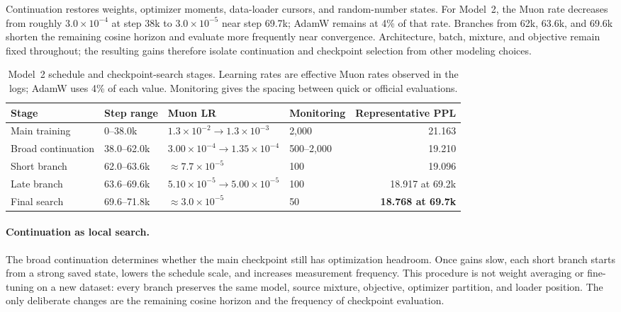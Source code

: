 \documentclass{article}
\begin{document}
Continuation restores weights, optimizer moments, data-loader cursors, and
random-number states. For Model~2, the Muon rate decreases from roughly
$3.0{\times}10^{-4}$ at step 38k to $3.0{\times}10^{-5}$ near step 69.7k;
AdamW remains at 4\% of that rate. Branches from 62k, 63.6k, and 69.6k shorten
the remaining cosine horizon and evaluate more frequently near convergence.
Architecture, batch, mixture, and objective remain fixed throughout; the
resulting gains therefore isolate continuation and checkpoint selection from
other modeling choices.

\begin{table}[H]
  \caption{Model~2 schedule and checkpoint-search stages. Learning rates are
  effective Muon rates observed in the logs; AdamW uses 4\% of each value.
  Monitoring gives the spacing between quick or official evaluations.}
  \label{tab:continuation-stages}
  \centering
  \small
  \setlength{\tabcolsep}{4.5pt}
  \begin{tabular}{@{}llllr@{}}
    \toprule
    Stage & Step range & Muon LR & Monitoring & Representative PPL \\
    \midrule
    Main training & 0--38.0k & $1.3{\times}10^{-2}\!\rightarrow1.3{\times}10^{-3}$ &
      2,000 & 21.163 \\
    Broad continuation & 38.0--62.0k &
      $3.00{\times}10^{-4}\!\rightarrow1.35{\times}10^{-4}$ &
      500--2,000 & 19.210 \\
    Short branch & 62.0--63.6k & $\approx7.7{\times}10^{-5}$ &
      100 & 19.096 \\
    Late branch & 63.6--69.6k &
      $5.10{\times}10^{-5}\!\rightarrow5.00{\times}10^{-5}$ &
      100 & 18.917 at 69.2k \\
    Final search & 69.6--71.8k & $\approx3.0{\times}10^{-5}$ &
      50 & \textbf{18.768 at 69.7k} \\
    \bottomrule
  \end{tabular}
\end{table}

\paragraph{Continuation as local search.}
The broad continuation determines whether the main checkpoint still has
optimization headroom. Once gains slow, each short branch starts from a
strong saved state, lowers the schedule scale, and increases measurement
frequency. This procedure is not weight averaging or fine-tuning on a new
dataset: every branch preserves the same model, source mixture, objective,
optimizer partition, and loader position. The only deliberate changes are
the remaining cosine horizon and the frequency of checkpoint evaluation.
\end{document}

